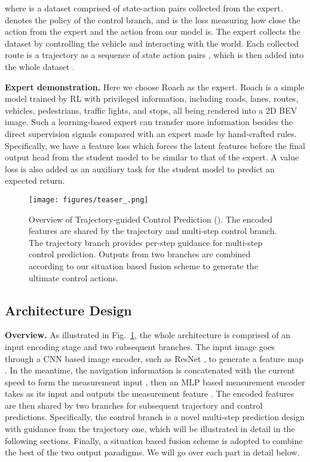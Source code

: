 \documentclass{article}
\begin{document}
where  is a dataset comprised of state-action pairs collected from the expert.  denotes the policy of the control branch, and  is the loss  measuring how close the action from the expert and the action from our model is. The expert collects the dataset by controlling the vehicle and interacting with the world. Each collected route is a trajectory  as a sequence of state action pairs , which is then added into the whole dataset . 

\textbf{Expert demonstration.}
Here we choose Roach \citep{zhang2021roach} as the expert. Roach is a simple model trained by RL with privileged information, including roads, lanes, routes, vehicles, pedestrians, traffic lights, and stops, all being rendered into a 2D BEV image. Such a learning-based expert can transfer more information besides the direct supervision signals compared with an expert made by hand-crafted rules.
Specifically, we have a feature loss which forces the latent features before the final output head from the student model to be similar to that of the expert. A value loss is also added as an auxiliary task for the student model to predict an expected return. 



\begin{figure}[t!]
    \centering
    \texttt{[image: figures/teaser\_.png]}
    \caption{Overview of Trajectory-guided Control Prediction (\algname).
The encoded features are shared by the trajectory and multi-step control branch. 
The trajectory branch provides per-step guidance for multi-step control prediction. Outputs from two branches are combined according to our situation based fusion scheme to generate the ultimate control actions. 
}
    \label{fig:pipeline}
\end{figure}

\subsection{Architecture Design} \label{sec:arch}
\textbf{Overview.} As illustrated in Fig.~\ref{fig:pipeline}, the whole architecture is comprised of an input encoding stage and two subsequent branches.
The input image  goes through a CNN based image encoder, such as ResNet \citep{he2016resnet}, to generate a feature map .
In the meantime, the navigation information  is concatenated with the current speed  to form the measurement input , then an MLP based measurement encoder takes  as its input and outputs the measurement feature .
The encoded features are then shared by two branches for subsequent trajectory and control predictions. Specifically, the control branch is a novel multi-step prediction design with guidance from the trajectory one, which will be illustrated in detail in the following sections.
Finally, a situation based fusion scheme is adopted to combine the best of the two output paradigms.
We will go over each part in detail below.
\end{document}
